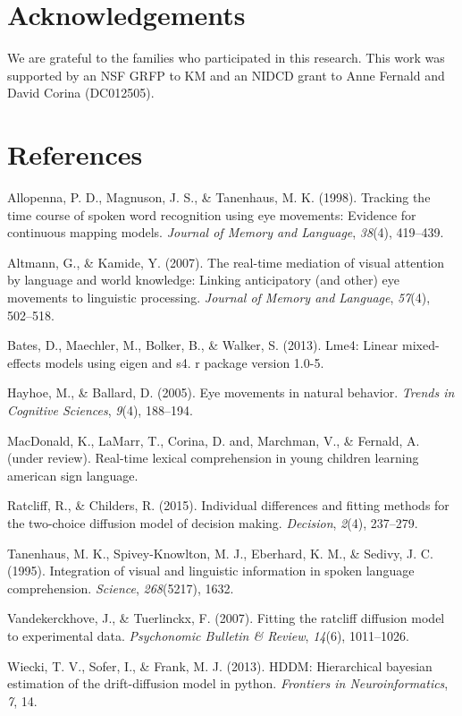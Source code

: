\documentclass[10pt, letterpaper]{article}
\begin{document}
\section{Acknowledgements}\label{acknowledgements}

We are grateful to the families who participated in this research. This
work was supported by an NSF GRFP to KM and an NIDCD grant to Anne
Fernald and David Corina (DC012505).

\section{References}\label{references}

\setlength{\parindent}{-0.1in} \setlength{\leftskip}{0.125in} \noindent

\hypertarget{refs}{}
\hypertarget{ref-allopenna1998tracking}{}
Allopenna, P. D., Magnuson, J. S., \& Tanenhaus, M. K. (1998). Tracking
the time course of spoken word recognition using eye movements: Evidence
for continuous mapping models. \emph{Journal of Memory and Language},
\emph{38}(4), 419--439.

\hypertarget{ref-altmann2007real}{}
Altmann, G., \& Kamide, Y. (2007). The real-time mediation of visual
attention by language and world knowledge: Linking anticipatory (and
other) eye movements to linguistic processing. \emph{Journal of Memory
and Language}, \emph{57}(4), 502--518.

\hypertarget{ref-bates2013lme4}{}
Bates, D., Maechler, M., Bolker, B., \& Walker, S. (2013). Lme4: Linear
mixed-effects models using eigen and s4. r package version 1.0-5.

\hypertarget{ref-hayhoe2005eye}{}
Hayhoe, M., \& Ballard, D. (2005). Eye movements in natural behavior.
\emph{Trends in Cognitive Sciences}, \emph{9}(4), 188--194.

\hypertarget{ref-macdonald2017realtime}{}
MacDonald, K., LaMarr, T., Corina, D. and, Marchman, V., \& Fernald, A.
(under review). Real-time lexical comprehension in young children
learning american sign language.

\hypertarget{ref-ratcliff2015individual}{}
Ratcliff, R., \& Childers, R. (2015). Individual differences and fitting
methods for the two-choice diffusion model of decision making.
\emph{Decision}, \emph{2}(4), 237--279.

\hypertarget{ref-tanenhaus1995integration}{}
Tanenhaus, M. K., Spivey-Knowlton, M. J., Eberhard, K. M., \& Sedivy, J.
C. (1995). Integration of visual and linguistic information in spoken
language comprehension. \emph{Science}, \emph{268}(5217), 1632.

\hypertarget{ref-vandekerckhove2007fitting}{}
Vandekerckhove, J., \& Tuerlinckx, F. (2007). Fitting the ratcliff
diffusion model to experimental data. \emph{Psychonomic Bulletin \&
Review}, \emph{14}(6), 1011--1026.

\hypertarget{ref-wiecki2013hddm}{}
Wiecki, T. V., Sofer, I., \& Frank, M. J. (2013). HDDM: Hierarchical
bayesian estimation of the drift-diffusion model in python.
\emph{Frontiers in Neuroinformatics}, \emph{7}, 14.
\end{document}
